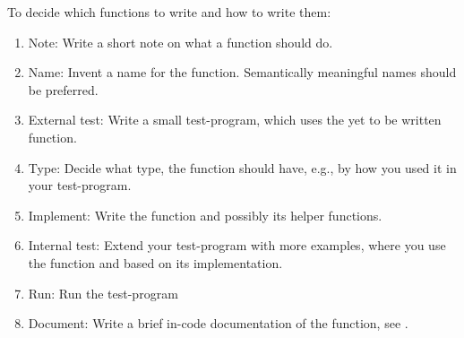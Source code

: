 \documentclass[fsharpNotes.tex]{subfiles}
\begin{document}
To decide which functions to write and how to write them:
\begin{enumerate}
\item Note: Write a short note on what a function should do.
\item Name: Invent a name for the function. Semantically meaningful names should be preferred.
\item External test: Write a small test-program, which uses the yet to be written function.
\item Type: Decide what type, the function should have, e.g., by how you used it in your test-program.
\item Implement: Write the function and possibly its helper functions.
\item Internal test: Extend your test-program with more examples, where you use the function and based on its implementation.
\item Run: Run the test-program
\item Document: Write a brief in-code documentation of the function, see .
\end{enumerate}
\end{document}
